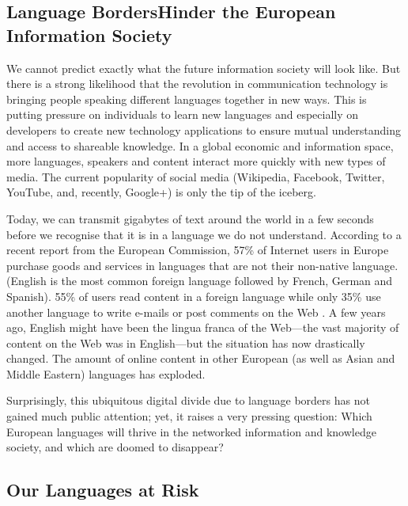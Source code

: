 \begin{multicols}{2}
\begin{itemize}
\begin{multicols}{2}
\subsection[Language Borders Hinder the European Information Society]{Language Borders\newline Hinder the European Information Society}

    We cannot predict exactly what the future information society will look like. But there is a strong likelihood that the revolution in communication technology is bringing people speaking different languages together in new ways. This is putting pressure on individuals to learn new languages and especially on developers to create new technology applications to ensure mutual understanding and access to shareable knowledge. In a global economic and information space, more languages, speakers and content interact more quickly with new types of media. The current popularity of social media (Wikipedia, Facebook, Twitter, YouTube, and, recently, Google+) is only the tip of the iceberg.


    Today, we can transmit gigabytes of text around the world in a few seconds before we recognise that it is in a language we do not understand. According to a recent report from the European Commission, 57\% of Internet users in Europe purchase goods and services in languages that are not their non-native language. (English is the most common foreign language followed by French, German and Spanish). 55\% of users read content in a foreign language while only 35\% use another language to write e-mails or post comments on the Web \cite{CAT-Nota1}. A few years ago, English might have been the lingua franca of the Web—the vast majority of content on the Web was in English—but the situation has now drastically changed. The amount of online content in other European (as well as Asian and Middle Eastern) languages has exploded.

    Surprisingly, this ubiquitous digital divide due to language borders has not gained much public attention; yet, it raises a very pressing question: Which European languages will thrive in the networked information and knowledge society, and which are doomed to disappear?

\subsection{Our Languages at Risk}


\end{multicols}
\end{itemize}
\end{multicols}
